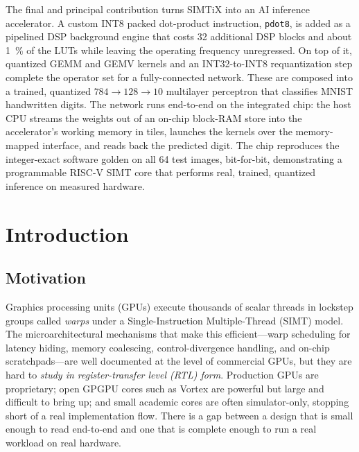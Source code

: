 \documentclass[12pt,a4paper,oneside]{report}
\newcommand{\code}[1]{\texttt{#1}}
\begin{document}
The final and principal contribution turns SIMTiX into an AI inference
accelerator. A custom INT8 packed dot-product instruction, \code{pdot8}, is
added as a pipelined DSP background engine that costs \num{32} additional DSP
blocks and about \SI{1}{\percent} of the LUTs while leaving the operating
frequency unregressed. On top of it, quantized GEMM and GEMV kernels and an
INT32-to-INT8 requantization step complete the operator set for a fully-connected
network. These are composed into a trained, quantized $784{\rightarrow}128{\rightarrow}10$
multilayer perceptron that classifies MNIST handwritten digits. The network runs
end-to-end on the integrated chip: the host CPU streams the weights out of an
on-chip block-RAM store into the accelerator's working memory in tiles, launches
the kernels over the memory-mapped interface, and reads back the predicted digit.
The chip reproduces the integer-exact software golden on all 64 test images,
bit-for-bit, demonstrating a programmable RISC-V SIMT core that performs real,
trained, quantized inference on measured hardware.

\clearpage

\tableofcontents
\clearpage
\listoffigures
{}
\clearpage
\listoftables
{}
\clearpage


\chapter{Introduction}
\label{ch:intro}

\section{Motivation}
Graphics processing units (GPUs) execute thousands of scalar threads in lockstep
groups called \emph{warps} under a Single-Instruction Multiple-Thread (SIMT)
model. The microarchitectural mechanisms that make this efficient---warp
scheduling for latency hiding, memory coalescing, control-divergence handling,
and on-chip scratchpads---are well documented at the level of commercial GPUs,
but they are hard to \emph{study in register-transfer level (RTL) form}.
Production GPUs are proprietary; open GPGPU cores such as Vortex are powerful but
large and difficult to bring up; and small academic cores are often
simulator-only, stopping short of a real implementation flow. There is a gap
between a design that is small enough to read end-to-end and one that is complete
enough to run a real workload on real hardware.
\end{document}

